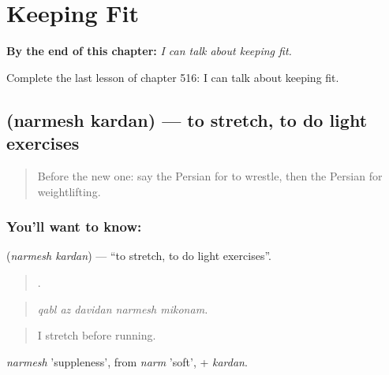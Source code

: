 
\chapter{Keeping Fit}
\label{ch:fa-keeping-fit}

\begin{chapteropening}
\textbf{By the end of this chapter:} \emph{I can talk about keeping fit.}

Complete the last lesson of chapter 516: I can talk about keeping fit.
\end{chapteropening}

\section[\texorpdfstring{\fa{نرمش} \fa{کردن} (narmesh kardan)}{نرمش کردن (narmesh kardan)}]{  (narmesh kardan) — to stretch, to do light exercises}

\label{lesson:FA-C516-narmesh-kardan}



\begin{quote}
Before the new one: say the Persian for to wrestle, then the Persian for weightlifting.
\end{quote}

\subsection*{You'll want to know:  }
\textbf{ } (\emph{narmesh kardan}) — \textquotedblleft{}to stretch, to do light exercises\textquotedblright{}.

\begin{quote}
    .
\end{quote}

\begin{quote}
\emph{qabl az davidan narmesh mikonam.}
\end{quote}

\begin{quote}
I stretch before running.
\end{quote}

\emph{narmesh} 'suppleness', from \emph{narm} 'soft', + \emph{kardan}.

